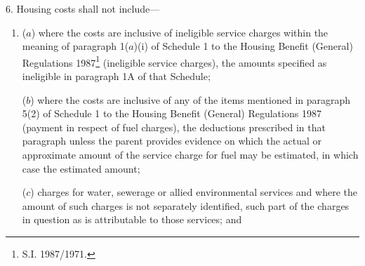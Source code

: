\documentclass[a4paper]{article}
\begin{document}
6.  Housing costs shall not include—
\begin{enumerate}\item[]

($a$) where the costs are inclusive of ineligible service charges within the meaning of paragraph 1($a$)(i) of Schedule 1 to the Housing Benefit (General) Regulations 1987\footnote{\frenchspacing S.I. 1987/1971.} (ineligible service charges), the amounts specified as ineligible in paragraph 1A of that Schedule;

%

($b$) where the costs are inclusive of any of the items mentioned in paragraph 5(2) of Schedule 1 to the Housing Benefit (General) Regulations 1987 (payment in respect of fuel charges), the deductions prescribed in that paragraph unless the parent provides evidence on which the actual or approximate amount of the service charge for fuel may be estimated, in which case the estimated amount; 

($c$) charges for water, sewerage or allied environmental services and where the amount of such charges is not separately identified, such part of the charges in question as is attributable to those services;
and


\end{enumerate}
\end{document}
